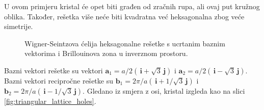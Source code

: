 \documentclass[utf8, seminar, numeric]{fer}
\begin{document}
U ovom primjeru kristal će opet biti građen od zračnih rupa, ali ovaj put
kružnog oblika. Također, rešetka više neće biti kvadratna već heksagonalna zbog
veće simetrije.

\begin{figure}[ht]
\centering
    \qquad
	\caption{Wigner-Seintzova ćelija heksagonalne rešetke s ucrtanim baznim
	vektorima i Brillouinova zona u inverznom prostoru.}
	\label{fig:triangular_lattice}
\end{figure}

Bazni vektori rešetke su vektori
${\mathbf{a}_1 = a/2 ( \, \mathbf{i} + \sqrt{3} \, \mathbf{j})}$ i
${\mathbf{a}_2 = a/2 ( \, \mathbf{i} - \sqrt{3} \, \mathbf{j})}$.
Bazni vektori recipročne rešetke su
${\mathbf{b}_1 = 2 \pi/a( \, \mathbf{i} + 1/\sqrt{3} \, \mathbf{j})}$ i
${\mathbf{b}_2 = 2 \pi/a( \, \mathbf{i} - 1/\sqrt{3} \, \mathbf{j})}$.
Gledano iz smjera z osi, kristal izgleda kao na slici
\ref{fig:triangular_lattice_holes}.
\end{document}
